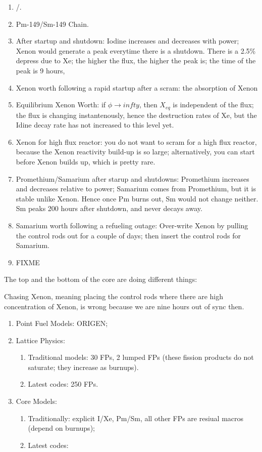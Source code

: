\documentclass{school-22.211-notes}
\begin{document}
\begin{enumerate}
\item {}/. 
\item Pm-149/Sm-149 Chain.
\item After startup and shutdown: Iodine increases and decreases with power; Xenon would generate a peak everytime there is a shutdown. There is a 2.5\% depress due to Xe; the higher the flux, the higher the peak is; the time of the peak is 9 hours, 
\item Xenon worth following a rapid startup after a scram: the absorption of Xenon 
\item Equilibrium Xenon Worth: if $\phi \to infty$, then $X_{eq}$ is independent of the flux; the flux is changing instantenously, hence the destruction rates of Xe, but the Idine decay rate has not increased to this level yet. 
\item Xenon for high flux reactor: you do not want to scram for a high flux reactor, because the Xenon reactivity build-up is so large; alternatively, you can start before Xenon builds up, which is pretty rare. 
\item Promethium/Samarium after starup and shutdowns: Promethium increases and decreases relative to power; Samarium comes from Promethium, but it is stable unlike Xenon. Hence once Pm burns out, Sm would not change neither. Sm peaks 200 hours after shutdown, and never decays away. 
\item Samarium worth following a refueling outage: Over-write Xenon by pulling the control rods out for a couple of days; then insert the control rods for Samarium. 
\item FIXME
\end{enumerate}


The top and the bottom of the core are doing different things: 

Chasing Xenon, meaning placing the control rods where there are high concentration of Xenon, is wrong because we are nine hours out of sync then. 


\begin{enumerate}
\item Point Fuel Models: ORIGEN;
\item Lattice Physics: 
  \begin{enumerate}
    \item Traditional models: 30 FPs, 2 lumped FPs (these fission products do not saturate; they increase as burnups).
    \item Latest codes: 250 FPs. 
  \end{enumerate}
\item Core Models: 
  \begin{enumerate}
    \item Traditionally: explicit I/Xe, Pm/Sm, all other FPs are resiual macros (depend on burnups);
    \item Latest codes: 
  \end{enumerate}
\end{enumerate}
\end{document}
